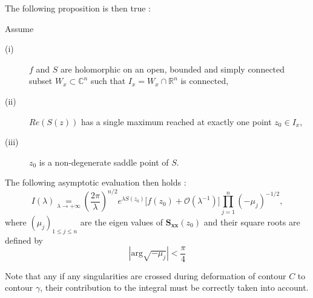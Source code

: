 The following proposition is then true :

\begin{prop}
Assume
\begin{description}
  \item[(i)] $f$ and $S$ are holomorphic on an open, bounded and simply connected subset $W_x \subset \mathbb{C}^n$ such that $I_x=W_x \cap \mathbb{R}^n$ is connected,
  \item[(ii)]$ Re\left( S(z) \right)$ has a single maximum reached at exactly one point $z_0 \in I_x$,
  \item[(iii)] $z_0$ is a non-degenerate saddle point of $S$.
\end{description}
The following asymptotic evaluation then holds :
\begin{equation}
I(\lambda) \underset{\lambda \to +\infty}{=} \left( \frac{2\pi}{\lambda} \right)^{n/2} e^{\lambda S(z_0)} \lbrack f(z_0)+ \mathcal{O}(\lambda^{-1}) \rbrack \prod_{j=1}^n (-\mu_j)^{-1/2},
\label{steepformula}
\end{equation}
where $(\mu_j)_{1\leq j \leq n}$ are the eigen values of $\mathbf{S_{xx}}(z_0)$ and their square roots are defined by
$$|\mbox{arg} \sqrt{-\mu_j}| <\frac{\pi}{4} $$
\end{prop}

Note that any if any singularities are crossed during deformation of contour $C$ to contour $\gamma$, their contribution to the integral must be correctly taken into account.
